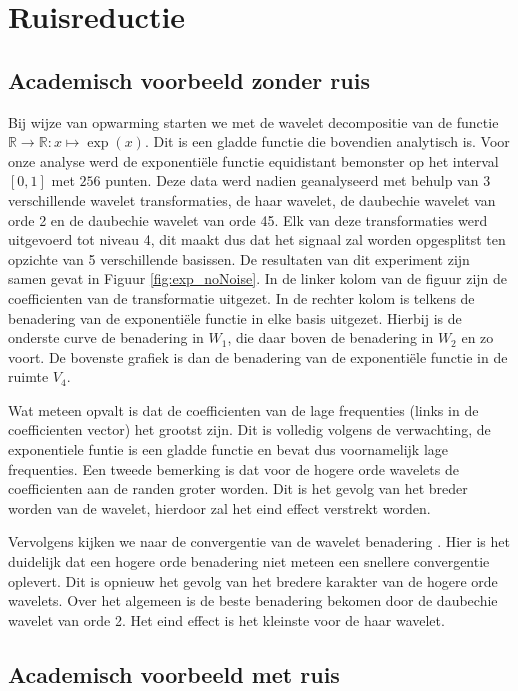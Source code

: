 \section{Ruisreductie}

\subsection{Academisch voorbeeld zonder ruis}

Bij wijze van opwarming starten we met de wavelet decompositie van de functie $ \mathbb{R}  \to \mathbb{R}: x \mapsto \exp(x)$. 
Dit is een gladde functie die bovendien analytisch is. 
Voor onze analyse werd de exponenti\"ele functie equidistant bemonster op het interval $ [0,1] $ met $ 256 $ punten.
Deze data werd nadien geanalyseerd met behulp van 3 verschillende wavelet transformaties, de haar wavelet, de daubechie wavelet van orde 2 en de daubechie wavelet van orde 45.
Elk van deze transformaties werd uitgevoerd tot niveau 4, dit maakt dus dat het signaal zal worden opgesplitst ten opzichte van 5 verschillende basissen.  
De resultaten van dit experiment zijn samen gevat in Figuur \ref{fig:exp_noNoise}.
In de linker kolom van de figuur zijn de coefficienten van de transformatie uitgezet.
In de rechter kolom is telkens de benadering van de exponenti\"ele functie in elke basis uitgezet.
Hierbij is de onderste curve de benadering in $ W_1 $, die daar boven de benadering in $ W_2 $ en zo voort.
De bovenste grafiek is dan de benadering van de exponenti\"ele functie in de ruimte $ V_4 $.

Wat meteen opvalt is dat de coefficienten van de lage frequenties (links in de coefficienten vector) het grootst zijn.
Dit is volledig volgens de verwachting, de exponentiele funtie is een gladde functie en bevat dus voornamelijk lage frequenties.
Een tweede bemerking is dat voor de hogere orde wavelets de coefficienten aan de randen groter worden.
Dit is het gevolg van het breder worden van de wavelet, hierdoor zal het eind effect verstrekt worden.

Vervolgens kijken we naar de convergentie van de wavelet benadering .
Hier is het duidelijk dat een hogere orde benadering niet meteen een snellere convergentie oplevert.
Dit is opnieuw het gevolg van het bredere karakter van de hogere orde wavelets.
Over het algemeen is de beste benadering bekomen door de daubechie wavelet van orde 2.
Het eind effect is het kleinste voor de haar wavelet.

\subsection{Academisch voorbeeld met ruis}

